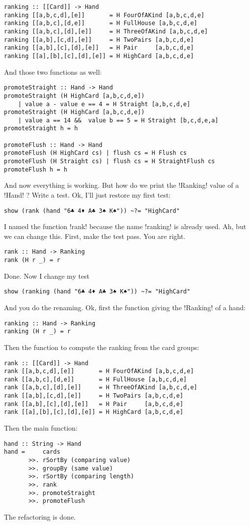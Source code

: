 \begin{lstlisting}[frame=single]
ranking :: [[Card]] -> Hand
ranking [[a,b,c,d],[e]]       = H FourOfAKind [a,b,c,d,e]
ranking [[a,b,c],[d,e]]       = H FullHouse [a,b,c,d,e]
ranking [[a,b,c],[d],[e]]     = H ThreeOfAKind [a,b,c,d,e]
ranking [[a,b],[c,d],[e]]     = H TwoPairs [a,b,c,d,e]
ranking [[a,b],[c],[d],[e]]   = H Pair     [a,b,c,d,e]
ranking [[a],[b],[c],[d],[e]] = H HighCard [a,b,c,d,e] 
\end{lstlisting}
And those two functions as well:
\begin{lstlisting}[frame=single]
promoteStraight :: Hand -> Hand
promoteStraight (H HighCard [a,b,c,d,e]) 
    | value a - value e == 4 = H Straight [a,b,c,d,e]
promoteStraight (H HighCard [a,b,c,d,e]) 
    | value a == 14 &&  value b == 5 = H Straight [b,c,d,e,a]
promoteStraight h = h

promoteFlush :: Hand -> Hand
promoteFlush (H HighCard cs) | flush cs = H Flush cs
promoteFlush (H Straight cs) | flush cs = H StraightFlush cs
promoteFlush h = h
\end{lstlisting}
\success And now everything is working.
\lhN But how do we print the \il!Ranking! value of a \il!Hand! ?
\lhA Write a test.
\lhN Ok, I'll just restore my first test:
\begin{lstlisting}[frame=single]
  show (rank (hand "6♣ 4♦ A♣ 3♠ K♠")) ~?= "HighCard"
\end{lstlisting}
\error I named the function \il!rank! because the name \il!ranking! is already used.
\lhA \error Ah, but we can change this.
\lhN First, make the test pass.
\lhA \error You are right.
\begin{lstlisting}[frame=single]
rank :: Hand -> Ranking
rank (H r _) = r
\end{lstlisting}
\success Done.
\lhN Now I change my test
\begin{lstlisting}[frame=single]
   show (ranking (hand "6♣ 4♦ A♣ 3♠ K♠")) ~?= "HighCard"
\end{lstlisting}
\error And you do the renaming.
\lhA \error Ok, first the function giving the \il!Ranking! of a hand:
\begin{lstlisting}[frame=single]
ranking :: Hand -> Ranking
ranking (H r _) = r
\end{lstlisting}
\lhN 
\lhA \error Then the function to compute the ranking from the card groups:
\begin{lstlisting}[frame=single]
rank :: [[Card]] -> Hand
rank [[a,b,c,d],[e]]       = H FourOfAKind [a,b,c,d,e]
rank [[a,b,c],[d,e]]       = H FullHouse [a,b,c,d,e]
rank [[a,b,c],[d],[e]]     = H ThreeOfAKind [a,b,c,d,e]
rank [[a,b],[c,d],[e]]     = H TwoPairs [a,b,c,d,e]
rank [[a,b],[c],[d],[e]]   = H Pair     [a,b,c,d,e]
rank [[a],[b],[c],[d],[e]] = H HighCard [a,b,c,d,e] 
\end{lstlisting}
\lhN
\lhA Then the main function:
\begin{lstlisting}[frame=single]
hand :: String -> Hand
hand =     cards
       >>. rSortBy (comparing value)
       >>. groupBy (same value)
       >>. rSortBy (comparing length)
       >>. rank
       >>. promoteStraight
       >>. promoteFlush    
\end{lstlisting}
\success The refactoring is done.
\lhend



